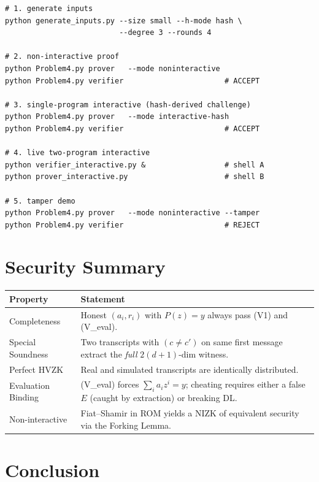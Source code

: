 \documentclass[11pt,a4paper]{article}
\begin{document}
\begin{lstlisting}[style=bashstyle]
# 1. generate inputs
python generate_inputs.py --size small --h-mode hash \
                          --degree 3 --rounds 4

# 2. non-interactive proof
python Problem4.py prover   --mode noninteractive
python Problem4.py verifier                       # ACCEPT

# 3. single-program interactive (hash-derived challenge)
python Problem4.py prover   --mode interactive-hash
python Problem4.py verifier                       # ACCEPT

# 4. live two-program interactive
python verifier_interactive.py &                  # shell A
python prover_interactive.py                      # shell B

# 5. tamper demo
python Problem4.py prover   --mode noninteractive --tamper
python Problem4.py verifier                       # REJECT
\end{lstlisting}

\section{Security Summary}

\begin{center}
\begin{tabular}{p{} p{}}
\toprule
\textbf{Property} & \textbf{Statement}\\
\midrule
Completeness      & Honest $(a_i,r_i)$ with $P(z)=y$ always pass (V1) and (V\_eval).\\
Special Soundness & Two transcripts with $(c\ne c')$ on same first message extract the \emph{full} $2(d+1)$-dim witness.\\
Perfect HVZK      & Real and simulated transcripts are identically distributed.\\
Evaluation Binding& (V\_eval) forces $\sum_i a_i z^{i}=y$; cheating requires either a false $E$ (caught by extraction) or breaking DL.\\
Non-interactive   & Fiat--Shamir in ROM yields a NIZK of equivalent security via the Forking Lemma.\\
\bottomrule
\end{tabular}
\end{center}

\section{Conclusion}
\end{document}
